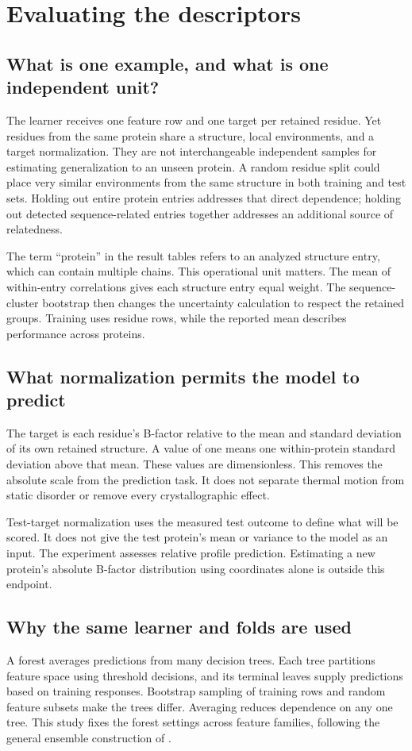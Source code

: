\section{Evaluating the descriptors}
\label{sec:evaluation-guide}
\subsection{What is one example, and what is one independent unit?}
The learner receives one feature row and one target per retained residue. Yet residues from the same protein share a structure, local environments, and a target normalization. They are not interchangeable independent samples for estimating generalization to an unseen protein. A random residue split could place very similar environments from the same structure in both training and test sets. Holding out entire protein entries addresses that direct dependence; holding out detected sequence-related entries together addresses an additional source of relatedness.

The term ``protein'' in the result tables refers to an analyzed structure entry, which can contain multiple chains. This operational unit matters. The mean of within-entry correlations gives each structure entry equal weight. The sequence-cluster bootstrap then changes the uncertainty calculation to respect the retained groups. Training uses residue rows, while the reported mean describes performance across proteins.

\subsection{What normalization permits the model to predict}
The target is each residue's B-factor relative to the mean and standard deviation of its own retained structure. A value of one means one within-protein standard deviation above that mean. These values are dimensionless. This removes the absolute scale from the prediction task. It does not separate thermal motion from static disorder or remove every crystallographic effect.

Test-target normalization uses the measured test outcome to define what will be scored. It does not give the test protein's mean or variance to the model as an input. The experiment assesses relative profile prediction. Estimating a new protein's absolute B-factor distribution using coordinates alone is outside this endpoint.

\subsection{Why the same learner and folds are used}
A forest averages predictions from many decision trees. Each tree partitions feature space using threshold decisions, and its terminal leaves supply predictions based on training responses. Bootstrap sampling of training rows and random feature subsets make the trees differ. Averaging reduces dependence on any one tree. This study fixes the forest settings across feature families, following the general ensemble construction of \citet{breiman2001}.

